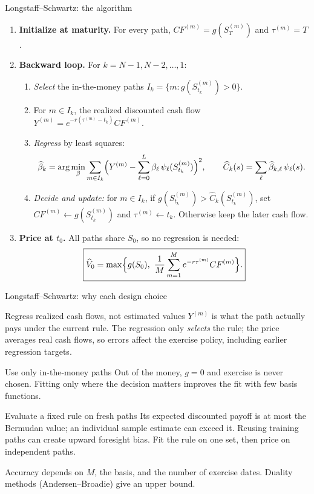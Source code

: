 \documentclass[handout,10pt,aspectratio=169]{beamer}
\begin{document}
\begin{frame}{Longstaff--Schwartz: the algorithm}
\small
\begin{enumerate}
\item \textbf{Initialize at maturity.} For every path,
      \(CF^{(m)}=g(S^{(m)}_T)\) and \(\tau^{(m)}=T\).
\item \textbf{Backward loop.} For \(k=N-1,N-2,\ldots,1\):
  \begin{enumerate}
  \item[(a)] \emph{Select} the in-the-money paths
        \(I_k=\{m:g(S^{(m)}_{t_k})>0\}\).
  \item[(b)] For \(m\in I_k\), the realized discounted cash flow
        \(Y^{(m)}=e^{-r(\tau^{(m)}-t_k)}CF^{(m)}\).
  \item[(c)] \emph{Regress} by least squares:
        \[
        \widehat\beta_k=\arg\min_\beta\sum_{m\in I_k}
        \Bigl(Y^{(m)}-\sum_{\ell=0}^L\beta_\ell\,\psi_\ell(S^{(m)}_{t_k})\Bigr)^2,
        \qquad
        \widehat C_k(s)=\sum_{\ell}\widehat\beta_{k,\ell}\,\psi_\ell(s).
        \]
  \item[(d)] \emph{Decide and update:} for \(m\in I_k\), if
        \(g(S^{(m)}_{t_k})>\widehat C_k(S^{(m)}_{t_k})\), set
        \(CF^{(m)}\leftarrow g(S^{(m)}_{t_k})\) and \(\tau^{(m)}\leftarrow t_k\).
        Otherwise keep the later cash flow.
  \end{enumerate}
\item \textbf{Price at \(t_0\).} All paths share \(S_0\), so no regression is
      needed:
      \[
      \boxed{\widehat V_0=\max\Bigl\{g(S_0),\ \frac1M\sum_{m=1}^M
      e^{-r\tau^{(m)}}CF^{(m)}\Bigr\}.}
      \]
\end{enumerate}
\end{frame}

\begin{frame}{Longstaff--Schwartz: why each design choice}
\small
\begin{block}{Regress realized cash flows, not estimated values}
\(Y^{(m)}\) is what the path actually pays under the current rule. The
regression only \emph{selects} the rule; the price averages real cash flows,
so errors affect the exercise policy, including earlier regression targets.
\end{block}
\begin{block}{Use only in-the-money paths}
Out of the money, \(g=0\) and exercise is never chosen. Fitting only where
the decision matters improves the fit with few basis functions.
\end{block}
\begin{alertblock}{Evaluate a fixed rule on fresh paths}
Its expected discounted payoff is at most the Bermudan value; an individual
sample estimate can exceed it. Reusing training paths can create upward
foresight bias. Fit the rule on one set, then price on independent paths.
\end{alertblock}
Accuracy depends on \(M\), the basis, and the number of exercise dates.
Duality methods (Andersen--Broadie) give an upper bound.
\end{frame}
\end{document}
